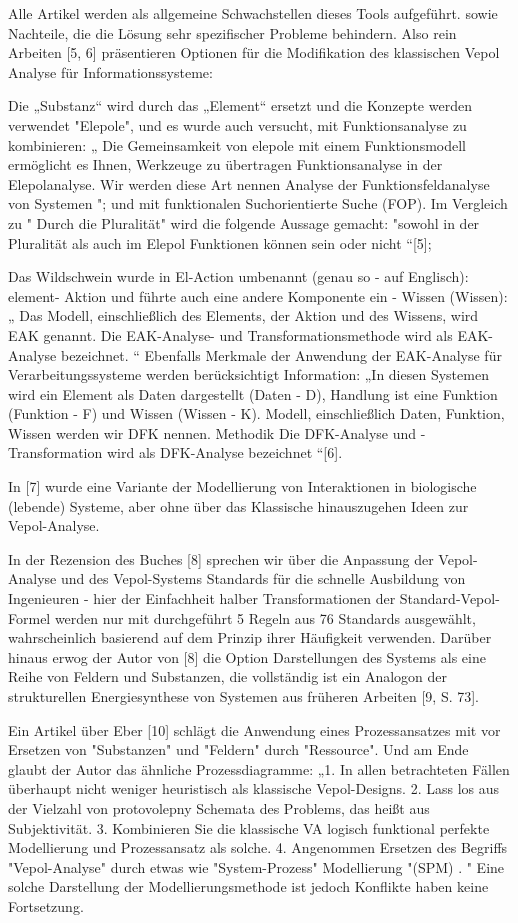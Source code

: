 \documentclass[11pt,a4paper]{article}
\begin{document}
Alle Artikel werden als allgemeine Schwachstellen dieses Tools aufgeführt.
sowie Nachteile, die die Lösung sehr spezifischer Probleme behindern. Also
rein Arbeiten [5, 6] präsentieren Optionen für die Modifikation des
klassischen Vepol Analyse für Informationssysteme:

Die „Substanz“ wird durch das „Element“ ersetzt und die Konzepte werden
verwendet "Elepole", und es wurde auch versucht, mit Funktionsanalyse zu
kombinieren: „ Die Gemeinsamkeit von elepole mit einem Funktionsmodell
ermöglicht es Ihnen, Werkzeuge zu übertragen Funktionsanalyse in der
Elepolanalyse. Wir werden diese Art nennen Analyse der Funktionsfeldanalyse
von Systemen "; und mit funktionalen Suchorientierte Suche (FOP). Im Vergleich
zu " Durch die Pluralität" wird die folgende Aussage gemacht: "sowohl in der
Pluralität als auch im Elepol Funktionen können sein oder nicht “[5];

Das Wildschwein wurde in El-Action umbenannt (genau so - auf Englisch):
element- Aktion und führte auch eine andere Komponente ein - Wissen (Wissen):
„ Das Modell, einschließlich des Elements, der Aktion und des Wissens, wird
EAK genannt.  Die EAK-Analyse- und Transformationsmethode wird als EAK-Analyse
bezeichnet. “ Ebenfalls Merkmale der Anwendung der EAK-Analyse für
Verarbeitungssysteme werden berücksichtigt Information: „In diesen Systemen
wird ein Element als Daten dargestellt (Daten - D), Handlung ist eine Funktion
(Funktion - F) und Wissen (Wissen - K). Modell, einschließlich Daten,
Funktion, Wissen werden wir DFK nennen. Methodik Die DFK-Analyse und
-Transformation wird als DFK-Analyse bezeichnet “[6].

In [7] wurde eine Variante der Modellierung von Interaktionen in biologische
(lebende) Systeme, aber ohne über das Klassische hinauszugehen Ideen zur
Vepol-Analyse.

In der Rezension des Buches [8] sprechen wir über die Anpassung der
Vepol-Analyse und des Vepol-Systems Standards für die schnelle Ausbildung von
Ingenieuren - hier der Einfachheit halber Transformationen der
Standard-Vepol-Formel werden nur mit durchgeführt 5 Regeln aus 76 Standards
ausgewählt, wahrscheinlich basierend auf dem Prinzip ihrer Häufigkeit
verwenden. Darüber hinaus erwog der Autor von [8] die Option Darstellungen des
Systems als eine Reihe von Feldern und Substanzen, die vollständig ist ein
Analogon der strukturellen Energiesynthese von Systemen aus früheren Arbeiten
[9, S. 73].

Ein Artikel über Eber [10] schlägt die Anwendung eines Prozessansatzes mit vor
Ersetzen von "Substanzen" und "Feldern" durch "Ressource". Und am Ende glaubt
der Autor das ähnliche Prozessdiagramme: „1. In allen betrachteten Fällen
überhaupt nicht weniger heuristisch als klassische Vepol-Designs. 2. Lass los
aus der Vielzahl von protovolepny Schemata des Problems, das heißt aus
Subjektivität. 3. Kombinieren Sie die klassische VA logisch funktional
perfekte Modellierung und Prozessansatz als solche. 4. Angenommen Ersetzen des
Begriffs "Vepol-Analyse" durch etwas wie "System-Prozess" Modellierung "(SPM)
. " Eine solche Darstellung der Modellierungsmethode ist jedoch Konflikte
haben keine Fortsetzung.
\end{document}
